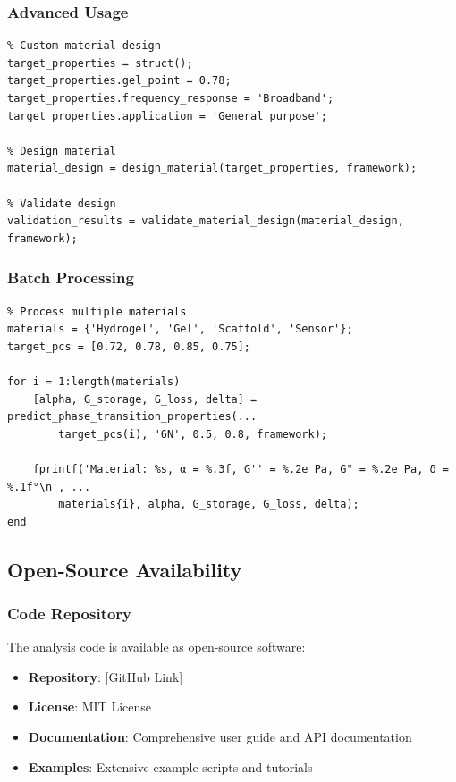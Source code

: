 \subsubsection{Advanced Usage}
\begin{verbatim}
% Custom material design
target_properties = struct();
target_properties.gel_point = 0.78;
target_properties.frequency_response = 'Broadband';
target_properties.application = 'General purpose';

% Design material
material_design = design_material(target_properties, framework);

% Validate design
validation_results = validate_material_design(material_design, framework);
\end{verbatim}

\subsubsection{Batch Processing}
\begin{verbatim}
% Process multiple materials
materials = {'Hydrogel', 'Gel', 'Scaffold', 'Sensor'};
target_pcs = [0.72, 0.78, 0.85, 0.75];

for i = 1:length(materials)
    [alpha, G_storage, G_loss, delta] = predict_phase_transition_properties(...
        target_pcs(i), '6N', 0.5, 0.8, framework);
    
    fprintf('Material: %s, α = %.3f, G'' = %.2e Pa, G" = %.2e Pa, δ = %.1f°\n', ...
        materials{i}, alpha, G_storage, G_loss, delta);
end
\end{verbatim}

\subsection{Open-Source Availability}

\subsubsection{Code Repository}
The analysis code is available as open-source software:

\begin{itemize}
    \item \textbf{Repository}: [GitHub Link]
    \item \textbf{License}: MIT License
    \item \textbf{Documentation}: Comprehensive user guide and API documentation
    \item \textbf{Examples}: Extensive example scripts and tutorials
\end{itemize}


